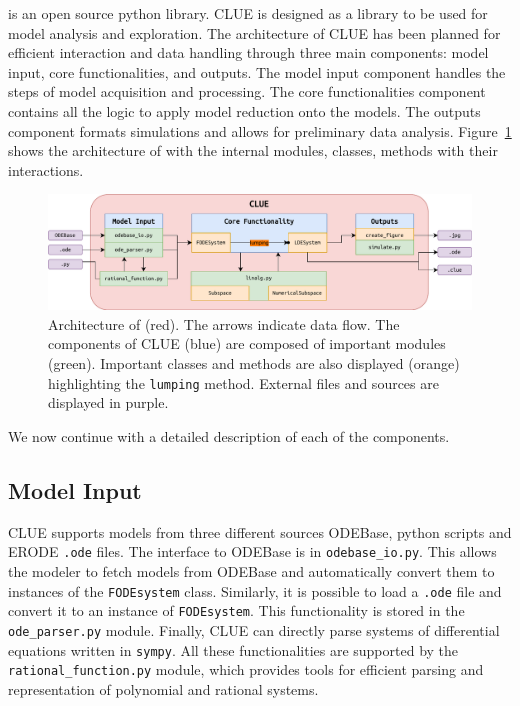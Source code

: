 \ToolName is an open source python library.
CLUE is designed as a library to be used for model analysis and exploration.
The architecture of CLUE has been planned for efficient interaction and data handling through three main components:
model input, core functionalities, and outputs. 
The model input component handles the steps of model acquisition and processing.
The core functionalities component contains all the logic to apply model reduction onto the models.
The outputs component formats simulations and allows for preliminary data analysis. 
Figure~\ref{fig:clue_arch} shows the architecture of \ToolName with the internal modules, classes, methods with their interactions.
\begin{figure}
	\centering
	\includegraphics[width=\textwidth]{img/clue.pdf}
	\caption{Architecture of \ToolName(red).
        The arrows indicate data flow.
        The components of CLUE (blue) are composed of important modules (green).
        Important classes and methods are also displayed (orange) highlighting the \texttt{lumping} method.
        External files and sources are displayed in purple.
     }
	\label{fig:clue_arch}
\end{figure}
We now continue with a detailed description of each of the components.

\subsection{Model Input}
CLUE supports models from three different sources ODEBase, python scripts and ERODE \texttt{.ode} files. 
The interface to ODEBase is in \texttt{odebase\_io.py}. 
This allows the modeler to fetch models from ODEBase and automatically convert them to instances of the \texttt{FODEsystem} class.
Similarly, it is possible to load a \texttt{.ode} file and convert it to an instance of \texttt{FODEsystem}. 
This functionality is stored in the \texttt{ode\_parser.py} module. 
Finally, CLUE can directly parse systems of differential equations written in \texttt{sympy}. 
All these functionalities are supported by the \texttt{rational\_function.py} module, which provides tools for efficient parsing and representation of polynomial and rational systems.

